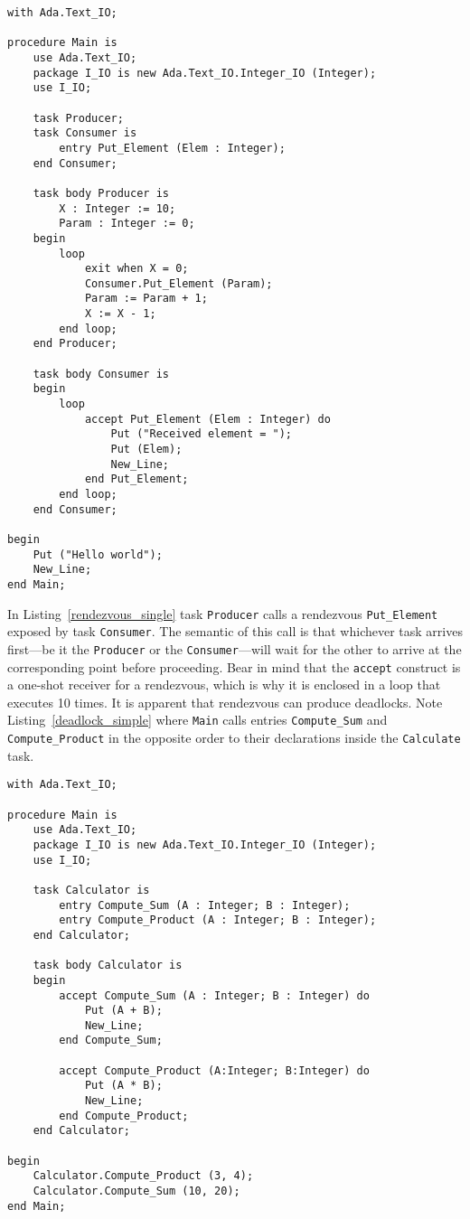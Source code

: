 \begin{minipage}{\listingwidth}
\lstset{language=ada}
\begin{lstlisting}[caption=Task rendezvous,label=rendezvous_single]
with Ada.Text_IO;

procedure Main is
	use Ada.Text_IO;
	package I_IO is new Ada.Text_IO.Integer_IO (Integer);
	use I_IO;

	task Producer;
	task Consumer is
		entry Put_Element (Elem : Integer);
	end Consumer;

	task body Producer is
		X : Integer := 10;
		Param : Integer := 0;
	begin
		loop
			exit when X = 0;
			Consumer.Put_Element (Param);
			Param := Param + 1;
			X := X - 1;
		end loop;
	end Producer;

	task body Consumer is
	begin
		loop
			accept Put_Element (Elem : Integer) do
				Put ("Received element = ");
				Put (Elem);
				New_Line;
			end Put_Element;
		end loop;
	end Consumer;

begin
	Put ("Hello world");
	New_Line;
end Main;
\end{lstlisting}
\end{minipage}

In Listing~\ref{rendezvous_single} task \texttt{Producer} calls a
rendezvous \texttt{Put\_Element} exposed by task
\texttt{Consumer}. The semantic of this call is that whichever task
arrives first---be it the \texttt{Producer} or the
\texttt{Consumer}---will wait for the other to arrive at the
corresponding point before proceeding. Bear in mind that the
\texttt{accept} construct is a one-shot receiver for a rendezvous,
which is why it is enclosed in a loop that executes 10 times. It is
apparent that rendezvous can produce deadlocks. Note
Listing~\ref{deadlock_simple} where \texttt{Main} calls entries
\texttt{Compute\_Sum} and \texttt{Compute\_Product} in the opposite
order to their declarations inside the \texttt{Calculate} task.

\begin{minipage}{\listingwidth}
\lstset{language=ada}
\begin{lstlisting}[caption=Deadlock in rendezvous caused by
    call/accept order inversion,label=deadlock_simple]
with Ada.Text_IO;

procedure Main is
	use Ada.Text_IO;
	package I_IO is new Ada.Text_IO.Integer_IO (Integer);
	use I_IO;

	task Calculator is
		entry Compute_Sum (A : Integer; B : Integer);
		entry Compute_Product (A : Integer; B : Integer);
	end Calculator;

	task body Calculator is
	begin
		accept Compute_Sum (A : Integer; B : Integer) do
			Put (A + B);
			New_Line;
		end Compute_Sum;

		accept Compute_Product (A:Integer; B:Integer) do
			Put (A * B);
			New_Line;
		end Compute_Product;
	end Calculator;

begin
	Calculator.Compute_Product (3, 4);
	Calculator.Compute_Sum (10, 20);
end Main;
\end{lstlisting}
\end{minipage}


